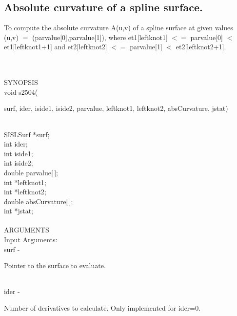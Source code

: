 \subsection{Absolute curvature of a spline surface.}
\begin{minipg1}
 To compute the absolute curvature A(u,v) of a spline surface at
                   given values (u,v) $=$ (parvalue[0],parvalue[1]), where
                   et1[leftknot1] $<=$ parvalue[0] $<$ et1[leftknot1+1] and
                   et2[leftknot2] $<=$ parvalue[1] $<$ et2[leftknot2+1].
\end{minipg1} \\ \\
SYNOPSIS\\
        \>  void s2504(\begin{minipg3}
            {\fov surf},  {\fov ider},  {\fov iside1},  {\fov iside2},  {\fov parvalue},  {\fov leftknot1},  {\fov leftknot2},
	     {\fov absCurvature},  {\fov jstat})
                \end{minipg3}\\
                \>\>    SISLSurf \> *{\fov surf};\\
                \>\>    int    \>  {\fov ider};\\
                \>\>    int    \>  {\fov iside1};\\
                \>\>    int    \>  {\fov iside2};\\
                \>\>    double \> {\fov parvalue}[\,];\\
                \>\>    int \> *{\fov leftknot1};\\
                \>\>    int \> *{\fov leftknot2};\\
                \>\>    double \> {\fov absCurvature}[\,];\\
                \>\>    int \> *{\fov jstat};\\
\\
ARGUMENTS\\
	\>Input Arguments:\\
        \>\>    {\fov surf}\> - \>  \begin{minipg2}
                     Pointer to the surface to evaluate.
                               \end{minipg2}\\[0.8ex]
        \>\>    {\fov ider}\> - \>  \begin{minipg2}
                     Number of derivatives to calculate.
                     Only implemented for ider=0.
                               \end{minipg2}\\[0.8ex]
